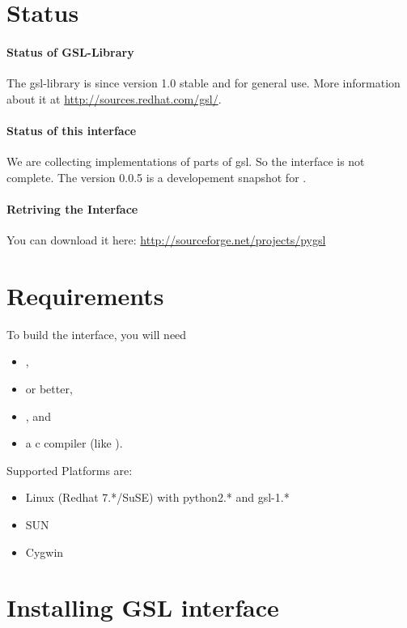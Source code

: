 \section{Status}

\paragraph*{Status of GSL-Library}
The gsl-library is since version 1.0 stable and for general use.
More information about it at \url{http://sources.redhat.com/gsl/}.

\paragraph*{Status of this interface}
We are collecting implementations of parts of gsl.
So the interface is not complete.
The version 0.0.5 is a developement snapshot for .

\paragraph*{Retriving the Interface}
You can download it here: \url{http://sourceforge.net/projects/pygsl}

\section{Requirements}

To build the interface, you will need
\begin{itemize}
\item {},
\item {} or better,
\item {}, and
\item a c compiler (like ).
\end{itemize}

Supported Platforms are:
\begin{itemize}
\item Linux (Redhat 7.*/SuSE) with python2.* and gsl-1.*
\item SUN
\item Cygwin
\end{itemize}

\section{Installing GSL interface}

